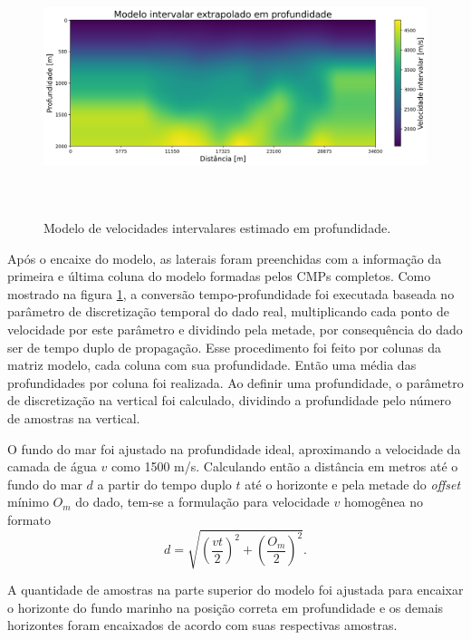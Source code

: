 \documentclass[
	12pt,				%
	openright,			%
	oneside,			%
	a4paper,			%
	english,			%
	brazil				%
	]{abntex2}
\begin{document}
    \begin{figure}[htp!]
		\centering
		\includegraphics[width=16cm,height=7.5cm]{../imagens/modeloExtrapoladoINT.png}
		\caption{Modelo de velocidades intervalares estimado em profundidade.}
		\label{modeloExtrapoladoINT}
	\end{figure}
	
	Após o encaixe do modelo, as laterais foram preenchidas com a informação da primeira e última coluna do modelo formadas pelos CMPs completos. Como mostrado na figura \ref{modeloExtrapoladoINT}, a conversão tempo-profundidade foi executada baseada no parâmetro de discretização temporal do dado real, multiplicando cada ponto de velocidade por este parâmetro e dividindo pela metade, por consequência do dado ser de tempo duplo de propagação. Esse procedimento foi feito por colunas da matriz modelo, cada coluna com sua profundidade. Então uma média das profundidades por coluna foi realizada. Ao definir uma profundidade, o parâmetro de discretização na vertical foi calculado, dividindo a profundidade pelo número de amostras na vertical. 
	
	O fundo do mar foi ajustado na profundidade ideal, aproximando a velocidade da camada de água $v$ como 1500 m/s. Calculando então a distância em metros até o fundo do mar $d$ a partir do tempo duplo $t$ até o horizonte e pela metade do \textit{offset} mínimo $O_m$ do dado, tem-se a formulação para velocidade $v$ homogênea no formato
%	
	\begin{equation}
		d = \sqrt{\left(\dfrac{vt}{2}\right)^2 + \left(\dfrac{O_m}{2}\right)^2}.
	\end{equation}	
	
	 A quantidade de amostras na parte superior do modelo foi ajustada para encaixar o horizonte do fundo marinho na posição correta em profundidade e os demais horizontes foram encaixados de acordo com suas respectivas amostras.
	
\end{document}
